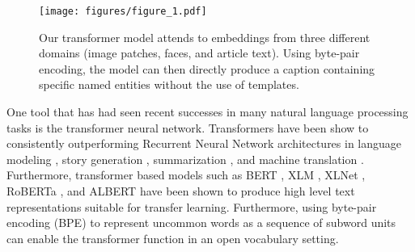 \begin{figure}[t]
	\begin{center}
		\texttt{[image: figures/figure\_1.pdf]}
	\end{center}
	\caption{Our transformer model attends to embeddings from three different
		domains (image patches, faces, and article text). Using byte-pair
		encoding, the model can then directly produce a caption containing
		specific named entities without the use of templates.}
	\label{fig:long}
	\label{fig:teaser}
\end{figure}

One tool that has had seen recent successes in many natural language processing
tasks is the transformer neural network.
Transformers have been show to consistently
outperforming Recurrent Neural Network architectures in language modeling
\cite{Radford2019LanguageMA},
story generation \cite{Fan2018HierarchicalNS}, summarization
\cite{Subramanian2019OnEA}, and machine translation \cite{Bojar2018Findings}.
Furthermore, transformer based models such as BERT \cite{Devlin2019BERT}, XLM
\cite{Lample2019CrosslingualLM}, XLNet \cite{Yang2019XLNetGA}, RoBERTa
\cite{Liu2019RoBERTaAR}, and ALBERT \cite{Lan2019ALBERT} have been shown to
produce high level text representations suitable for transfer learning.
Furthermore, using byte-pair
encoding (BPE) \cite{Sennrich2015NeuralMT} to represent uncommon words as a
sequence of subword units can enable the transformer function in an open
vocabulary setting.






